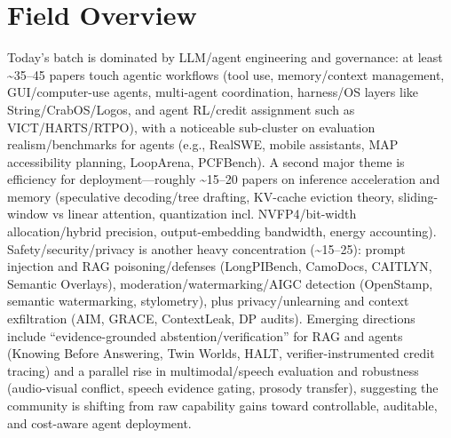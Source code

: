 \documentclass[12pt,letterpaper]{article}
\begin{document}
\medskip



\section*{Field Overview}
{\footnotesize Today's batch is dominated by LLM/agent engineering and governance: at least \textasciitilde{}35--45 papers touch agentic workflows (tool use, memory/context management, GUI/computer-use agents, multi-agent coordination, harness/OS layers like String/CrabOS/Logos, and agent RL/credit assignment such as VICT/HARTS/RTPO), with a noticeable sub-cluster on evaluation realism/benchmarks for agents (e.g., RealSWE, mobile assistants, MAP accessibility planning, LoopArena, PCFBench). A second major theme is efficiency for deployment---roughly \textasciitilde{}15--20 papers on inference acceleration and memory (speculative decoding/tree drafting, KV-cache eviction theory, sliding-window vs linear attention, quantization incl. NVFP4/bit-width allocation/hybrid precision, output-embedding bandwidth, energy accounting). Safety/security/privacy is another heavy concentration (\textasciitilde{}15--25): prompt injection and RAG poisoning/defenses (LongPIBench, CamoDocs, CAITLYN, Semantic Overlays), moderation/watermarking/AIGC detection (OpenStamp, semantic watermarking, stylometry), plus privacy/unlearning and context exfiltration (AIM, GRACE, ContextLeak, DP audits). Emerging directions include ``evidence-grounded abstention/verification'' for RAG and agents (Knowing Before Answering, Twin Worlds, HALT, verifier-instrumented credit tracing) and a parallel rise in multimodal/speech evaluation and robustness (audio-visual conflict, speech evidence gating, prosody transfer), suggesting the community is shifting from raw capability gains toward controllable, auditable, and cost-aware agent deployment.}
\end{document}
